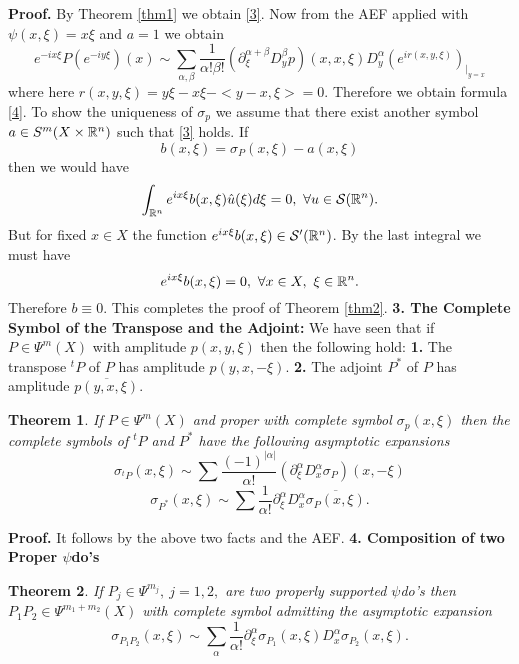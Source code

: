 \documentclass[12pt,reqno]{amsart}
\theoremstyle{plain}  %
\newtheorem{theorem}{Theorem}
\theoremstyle{definition}
\newcommand{\nin}{\noindent}
\begin{document}
\nin
{\bf Proof.}  By Theorem \ref{thm1} we obtain \eqref{3}. 
Now from the AEF applied with $ \psi (x, \xi) = x \xi $ and $ a = 1 $ we obtain
$$e^{-ix \xi} P(e^{-i y \xi})(x) \sim \sum_{\alpha, \beta} \frac{1}{\alpha ! \beta !}
\left ( \partial^{\alpha + \beta}_\xi D^\beta_y p \right ) (x, x, \xi) D^\alpha_y
(e^{ir(x, y, \xi)})_{\big |_{y=x}}$$
where here $ r(x, y, \xi) = y\xi - x \xi - <y-x, \xi> = 0$.  Therefore we obtain
formula \eqref{4}.
\vskip0.1in
\noindent
To show the uniqueness of $ \sigma_p $ we assume that there exist another
symbol $ a \in S^m (X \times \Bbb R^n) $ such that \eqref{3} holds. If
$$b(x, \xi) = \sigma_P (x, \xi) - a(x, \xi) $$
then we would have
$$\int_{\Bbb R^n} e^{ix \xi}b(x, \xi)  \hat u (\xi) d \xi = 0, \ \forall u
\in \mathcal{S}(\Bbb R^n). $$
But for fixed $ x \in X $ the function $ e^{ix \xi} b(x, \xi) \in \mathcal S^\prime(\Bbb
R^n)$.  By the last integral we must have
$$e^{ix \xi} b(x, \xi) = 0, \ \forall x \in X, \ \xi \in \Bbb R^n.$$
Therefore $ b \equiv 0$.  This completes the proof of Theorem \ref{thm2}.
\vskip0.1in
\nin
{\bf 3. The Complete Symbol of the Transpose and the Adjoint:}
\vskip0.1in
\nin
We have seen that if $ P \in \Psi^m(X) $ with amplitude $ p(x, y, \xi) $ then the
following hold:
\vskip0.1in
\noindent
{\bf 1.}  The transpose $ {}^tP $ of $ P $ has amplitude $ p(y, x, - \xi)$.
\vskip0.1in
\noindent
{\bf 2.}  The adjoint $ P^* $ of $ P $ has amplitude $ \overline{p(y, x, \xi)}$.
\vskip0.1in
\nin
\begin{theorem}
	\label{thm3}
	If $ P \in \Psi^m(X) $ and proper with complete symbol
$ \sigma_p(x, \xi) $ then the complete symbols of ${}^t P $ and $ P^* $ have the
following asymptotic expansions
\begin{equation}
	\label{5}
	\sigma_{{}^tP} (x, \xi) \sim \sum \frac{(-1)^{|\alpha|}}{\alpha !} \left (
\partial^\alpha_\xi D^\alpha_x \sigma_P \right ) (x, - \xi) 
\end{equation}
\begin{equation}
	\label{6}
\sigma_{P^*} (x, \xi) \sim \sum \frac{1}{\alpha !} \partial^\alpha_\xi
D^\alpha_x \overline{\sigma_P (x, \xi)}.
\end{equation}
\end{theorem}
\nin
{\bf Proof.}  It follows by the above two facts and the AEF. 
\vskip0.2in
\nin
{\bf 4. Composition of two Proper $ \psi$do's}
\begin{theorem}
	\label{thm4}
	If $ P_j \in \Psi^{m_j}, \ j = 1, 2, $ are two properly
supported $\psi$do's then
$ P_1 P_2 \in \Psi^{m_1 + m_2} (X) $ with complete symbol admitting the
asymptotic expansion
\begin{equation}
	\label{7}
	\sigma_{P_1P_2} (x, \xi) \sim \sum_\alpha \frac{1}{\alpha !}
\partial^\alpha_\xi \sigma_{P_1} (x, \xi) D^\alpha_x \sigma_{P_2} (x, \xi).
\end{equation}
\end{theorem}
\end{document}
